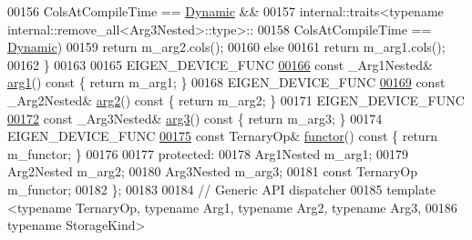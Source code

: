 \begin{DoxyCode}
00156                      ColsAtCompileTime == \hyperlink{namespace_eigen_ad81fa7195215a0ce30017dfac309f0b2}{Dynamic} &&
00157              internal::traits<\textcolor{keyword}{typename} internal::remove\_all<Arg3Nested>::type>::
00158                      ColsAtCompileTime == \hyperlink{namespace_eigen_ad81fa7195215a0ce30017dfac309f0b2}{Dynamic})
00159       \textcolor{keywordflow}{return} m\_arg2.cols();
00160     \textcolor{keywordflow}{else}
00161       \textcolor{keywordflow}{return} m\_arg1.cols();
00162   \}
00163 
00165   EIGEN\_DEVICE\_FUNC
\hyperlink{group___core___module_a37ec6f7c9b863f58a3e193cac44bdd82}{00166}   \textcolor{keyword}{const} \_Arg1Nested& \hyperlink{group___core___module_a37ec6f7c9b863f58a3e193cac44bdd82}{arg1}()\textcolor{keyword}{ const }\{ \textcolor{keywordflow}{return} m\_arg1; \}
00168   EIGEN\_DEVICE\_FUNC
\hyperlink{group___core___module_a271606675838696dd7660d4d847ae5f7}{00169}   \textcolor{keyword}{const} \_Arg2Nested& \hyperlink{group___core___module_a271606675838696dd7660d4d847ae5f7}{arg2}()\textcolor{keyword}{ const }\{ \textcolor{keywordflow}{return} m\_arg2; \}
00171   EIGEN\_DEVICE\_FUNC
\hyperlink{group___core___module_aab71f401afd7ebc25428369c30151a1f}{00172}   \textcolor{keyword}{const} \_Arg3Nested& \hyperlink{group___core___module_aab71f401afd7ebc25428369c30151a1f}{arg3}()\textcolor{keyword}{ const }\{ \textcolor{keywordflow}{return} m\_arg3; \}
00174   EIGEN\_DEVICE\_FUNC
\hyperlink{group___core___module_acec526305dd83e6c0b3bd2cdbfd19307}{00175}   \textcolor{keyword}{const} TernaryOp& \hyperlink{group___core___module_acec526305dd83e6c0b3bd2cdbfd19307}{functor}()\textcolor{keyword}{ const }\{ \textcolor{keywordflow}{return} m\_functor; \}
00176 
00177  \textcolor{keyword}{protected}:
00178   Arg1Nested m\_arg1;
00179   Arg2Nested m\_arg2;
00180   Arg3Nested m\_arg3;
00181   \textcolor{keyword}{const} TernaryOp m\_functor;
00182 \};
00183 
00184 \textcolor{comment}{// Generic API dispatcher}
00185 \textcolor{keyword}{template} <\textcolor{keyword}{typename} TernaryOp, \textcolor{keyword}{typename} Arg1, \textcolor{keyword}{typename} Arg2, \textcolor{keyword}{typename} Arg3,
00186           \textcolor{keyword}{typename} StorageKind>

\end{DoxyCode}
